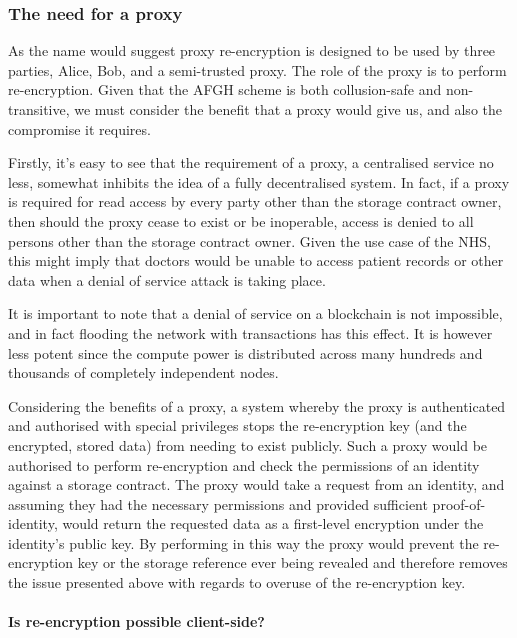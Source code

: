 \subsubsection{The need for a proxy}

As the name would suggest proxy re-encryption is designed to be used by three parties, Alice, Bob, and a semi-trusted proxy. The role of the proxy is to perform re-encryption. Given that the AFGH scheme is both collusion-safe and non-transitive, we must consider the benefit that a proxy would give us, and also the compromise it requires.

Firstly, it's easy to see that the requirement of a proxy, a centralised service no less, somewhat inhibits the idea of a fully decentralised system. In fact, if a proxy is required for read access by every party other than the storage contract owner, then should the proxy cease to exist or be inoperable, access is denied to all persons other than the storage contract owner. Given the use case of the NHS, this might imply that doctors would be unable to access patient records or other data when a denial of service attack is taking place.

It is important to note that a denial of service on a blockchain is not impossible, and in fact flooding the network with transactions has this effect. It is however less potent since the compute power is distributed across many hundreds and thousands of completely independent nodes.

Considering the benefits of a proxy, a system whereby the proxy is authenticated and authorised with special privileges stops the re-encryption key (and the encrypted, stored data) from needing to exist publicly. Such a proxy would be authorised to perform re-encryption and check the permissions of an identity against a storage contract. The proxy would take a request from an identity, and assuming they had the necessary permissions and provided sufficient proof-of-identity, would return the requested data as a first-level encryption under the identity's public key. By performing in this way the proxy would prevent the re-encryption key or the storage reference ever being revealed and therefore removes the issue presented above with regards to overuse of the re-encryption key.

\paragraph{Is re-encryption possible client-side?}

